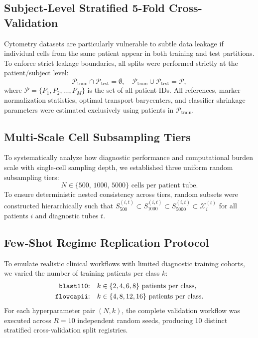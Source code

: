 \documentclass[10pt,journal,compsoc]{IEEEtran}
\begin{document}
\subsection{Subject-Level Stratified 5-Fold Cross-Validation}
Cytometry datasets are particularly vulnerable to subtle data leakage if individual cells from the same patient appear in both training and test partitions. To enforce strict leakage boundaries, all splits were performed strictly at the patient/subject level:
\begin{equation}
    \mathcal{P}_{\text{train}} \cap \mathcal{P}_{\text{test}} = \emptyset, \quad \mathcal{P}_{\text{train}} \cup \mathcal{P}_{\text{test}} = \mathcal{P},
\end{equation}
where $\mathcal{P} = \{P_1, P_2, \dots, P_M\}$ is the set of all patient IDs. All references, marker normalization statistics, optimal transport barycenters, and classifier shrinkage parameters were estimated exclusively using patients in $\mathcal{P}_{\text{train}}$.

\subsection{Multi-Scale Cell Subsampling Tiers}
To systematically analyze how diagnostic performance and computational burden scale with single-cell sampling depth, we established three uniform random subsampling tiers:
\begin{equation}
    N \in \{500, \, 1000, \, 5000\} \text{ cells per patient tube}.
\end{equation}
To ensure deterministic nested consistency across tiers, random subsets were constructed hierarchically such that $S_{500}^{(i,t)} \subset S_{1000}^{(i,t)} \subset S_{5000}^{(i,t)} \subset \mathcal{X}_{i}^{(t)}$ for all patients $i$ and diagnostic tubes $t$.

\subsection{Few-Shot Regime Replication Protocol}
To emulate realistic clinical workflows with limited diagnostic training cohorts, we varied the number of training patients per class $k$:
\begin{align}
    \text{\texttt{blast110}:} \quad & k \in \{2, 4, 6, 8\} \text{ patients per class}, \\
    \text{\texttt{flowcapii}:} \quad & k \in \{4, 8, 12, 16\} \text{ patients per class}.
\end{align}
For each hyperparameter pair $(N, k)$, the complete validation workflow was executed across $R=10$ independent random seeds, producing 10 distinct stratified cross-validation split registries. 
\end{document}
